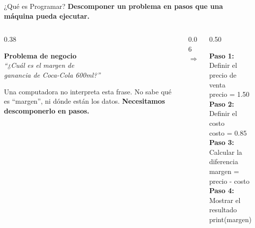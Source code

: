 \documentclass[aspectratio=169, 11pt]{beamer}
\begin{document}
\begin{frame}{¿Qué es Programar?}
  \vspace{-6pt}
  {\small\color{arcaDark}\bfseries
    Descomponer un problema en pasos que una máquina pueda ejecutar.}

  \vspace{4pt}
  \begin{columns}[T]
    \begin{column}{0.38\textwidth}
      \begin{tcolorbox}[
        colback=arcaDark, colframe=arcaDark, boxrule=0pt,
        arc=4pt, left=6pt, right=6pt, top=5pt, bottom=5pt
      ]
        {\scriptsize\color{white}\bfseries\faIndustry\hspace{4pt}Problema de negocio}\\[3pt]
        {\scriptsize\color{white!85}\itshape
        ``¿Cuál es el margen de\\
        ganancia de Coca-Cola 600ml?''}
      \end{tcolorbox}

      \vspace{4pt}
      {\scriptsize\color{textMuted}
        Una computadora no interpreta esta frase.
        No sabe qué es ``margen'', ni dónde están los datos.
        \textbf{Necesitamos descomponerlo en pasos.}}
    \end{column}

    \begin{column}{0.06\textwidth}
      \centering
      \vspace{20pt}
      {\Large\color{arcaRed}$\Rightarrow$}
    \end{column}

    \begin{column}{0.50\textwidth}
      \begin{tcolorbox}[
        colback=arcaGray, colframe=arcaRed, boxrule=0pt, leftrule=3pt,
        arc=3pt, left=5pt, right=5pt, top=4pt, bottom=4pt
      ]
        {\scriptsize\color{arcaRed}\bfseries Paso 1:} {\scriptsize Definir el precio de venta}\\
        {\scriptsize\ttfamily\color{textDark} precio = 1.50}\\[3pt]
        {\scriptsize\color{arcaRed}\bfseries Paso 2:} {\scriptsize Definir el costo}\\
        {\scriptsize\ttfamily\color{textDark} costo = 0.85}\\[3pt]
        {\scriptsize\color{arcaRed}\bfseries Paso 3:} {\scriptsize Calcular la diferencia}\\
        {\scriptsize\ttfamily\color{textDark} margen = precio - costo}\\[3pt]
        {\scriptsize\color{arcaRed}\bfseries Paso 4:} {\scriptsize Mostrar el resultado}\\
        {\scriptsize\ttfamily\color{textDark} print(margen)}
      \end{tcolorbox}
    \end{column}
  \end{columns}


\end{frame}
\end{document}
